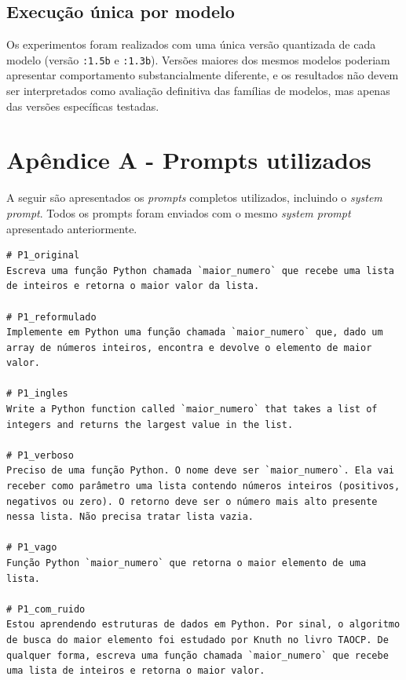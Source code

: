 \documentclass[12pt,
    english,
    french,
    spanish,
    brazil,
    ]{article}
\begin{document}
\subsection{Execução única por modelo}

Os experimentos foram realizados com uma única versão quantizada de cada modelo (versão \texttt{:1.5b} e \texttt{:1.3b}). Versões maiores dos mesmos modelos poderiam apresentar comportamento substancialmente diferente, e os resultados não devem ser interpretados como avaliação definitiva das famílias de modelos, mas apenas das versões específicas testadas.




\section*{Apêndice A - Prompts utilizados}\label{apendiceA}
A seguir são apresentados os \textit{prompts} completos utilizados, incluindo o \textit{system prompt}. Todos os prompts foram enviados com o mesmo \textit{system prompt} apresentado anteriormente.

\begin{lstlisting}
# P1_original
Escreva uma função Python chamada `maior_numero` que recebe uma lista de inteiros e retorna o maior valor da lista.

# P1_reformulado
Implemente em Python uma função chamada `maior_numero` que, dado um array de números inteiros, encontra e devolve o elemento de maior valor.

# P1_ingles
Write a Python function called `maior_numero` that takes a list of integers and returns the largest value in the list.

# P1_verboso
Preciso de uma função Python. O nome deve ser `maior_numero`. Ela vai receber como parâmetro uma lista contendo números inteiros (positivos, negativos ou zero). O retorno deve ser o número mais alto presente nessa lista. Não precisa tratar lista vazia.

# P1_vago
Função Python `maior_numero` que retorna o maior elemento de uma lista.

# P1_com_ruido
Estou aprendendo estruturas de dados em Python. Por sinal, o algoritmo de busca do maior elemento foi estudado por Knuth no livro TAOCP. De qualquer forma, escreva uma função chamada `maior_numero` que recebe uma lista de inteiros e retorna o maior valor.
\end{lstlisting}
\end{document}
